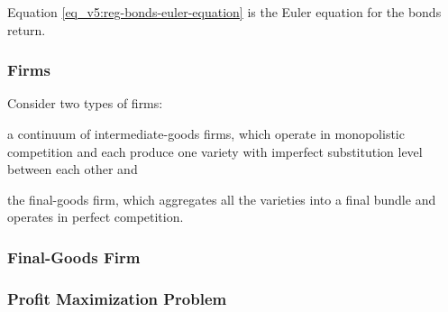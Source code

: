 \documentclass[../thesis.tex]{subfiles}
\begin{document}
Equation \ref{eq_v5:reg-bonds-euler-equation} is the Euler equation for the bonds return.

\begin{comment}
	
Substitute $\mu_{\eta t}$ and $\mu_{t+1}$ from equation \ref{eq_v5:reg-FOC-C1-eta-t2} in \ref{eq_v5:reg-household-FOC-Kt}:
\begin{alignat}{2}
	\mu_{\eta t} P_{\eta t} &= \beta \mathbb{E}_t \{ \mu_{t+1} [(1-\delta) P_{\eta, t+1} + R_{K,t+1}] \} &\implies \tag{\ref{eq_v5:reg-household-FOC-Kt}} 
	\\
	\frac{ C_{\eta t}^{1-\sigma}}{Q_{\eta t}} P_{\eta t} &= \beta \mathbb{E}_t \left\{ \frac{ C_{\eta, t+1}^{1-\sigma}}{Q_{\eta, t+1}} [(1-\delta) P_{\eta, t+1} + R_{K,t+1}] \right\} \label{eq_v5:reg-capital-euler-equation}
\end{alignat}

Equation \ref{eq_v5:reg-capital-euler-equation} is the Euler equation for the capital return.

\end{comment}


\subsubsection*{Firms}

Consider two types of firms: 
\begin{enumerate*}[label=(\arabic*)]
	\item a continuum of intermediate-goods firms, which operate in monopolistic competition and each produce one variety with imperfect substitution level between each other and
	
	\item the final-goods firm, which aggregates all the varieties into a final bundle and operates in perfect competition.
\end{enumerate*}


\subsubsection{Final-Goods Firm}

\subsubsection*{Profit Maximization Problem}
\end{document}
